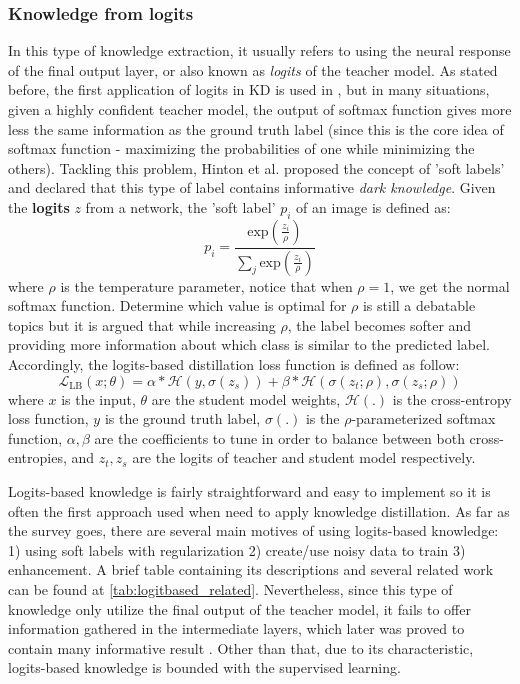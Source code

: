 \subsubsection{Knowledge from logits}
In this type of knowledge extraction, it usually refers to using the neural response of the final output layer, or also known as \textit{logits} of the teacher model. As stated before, the first application of logits in KD is used in \cite{firstkdpaper}, but in many situations, given a highly confident teacher model, the output of softmax function gives more less the same information as the ground truth label (since this is the core idea of softmax function - maximizing the probabilities of one while minimizing the others). Tackling this problem, Hinton et al. \cite{hintonfirstkd} proposed the concept of 'soft labels' and declared that this type of label contains informative \textit{dark knowledge}. Given the \textbf{logits} $z$ from a network, the 'soft label' $p_i$ of an image is defined as:
\[
   p_i = \frac{\text{exp}(\frac{z_i}{\rho})}{\sum_j \text{exp}(\frac{z_i}{\rho})}
\]
where $\rho$ is the temperature parameter, notice that when $\rho=1$, we get the normal softmax function. Determine which value is optimal for $\rho$ is still a debatable topics but it is argued that while increasing $\rho$, the label becomes softer and providing more information about which class is similar to the predicted label. Accordingly, the logits-based distillation loss function is defined as follow:
\[
   \mathcal{L}_{\text{LB}}(x;\theta) = \alpha * \mathcal{H}(y, \sigma(z_s)) + \beta * \mathcal{H}(\sigma(z_t;\rho), \sigma(z_s;\rho))
\]
where $x$ is the input, $\theta$ are the student model weights, $\mathcal{H}(.)$ is the cross-entropy loss function, $y$ is the ground truth label, $\sigma(.)$ is the $\rho$-parameterized softmax function, $\alpha, \beta$ are the coefficients to tune in order to balance between both cross-entropies, and $z_t, z_s$ are the logits of teacher and student model respectively.

Logits-based knowledge is fairly straightforward and easy to implement so it is often the first approach used when need to apply knowledge distillation. As far as the survey goes, there are several main motives of using logits-based knowledge: 1) using soft labels with regularization 2) create/use noisy data to train 3) enhancement. A brief table containing its descriptions and several related work can be found at \ref{tab:logitbased_related}. Nevertheless, since this type of knowledge only utilize the final output of the teacher model, it fails to offer information gathered in the intermediate layers, which later was proved to contain many informative result \cite{featurebased01}. Other than that, due to its characteristic, logits-based knowledge is bounded with the supervised learning.

